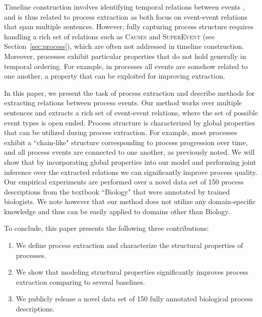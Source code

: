 Timeline construction involves identifying temporal relations between events \cite{Chambers08,Yoshikawa09,Denis11,Do12,Mcclosky12}, and is thus related to process extraction as both focus on event-event relations that span multiple sentences. However, fully capturing process structure requires handling a rich set of relations such as \textsc{Causes} and \textsc{SuperEvent} (see Section~\ref{sec:process}), which are often not addressed in timeline construction. Moreover, processes exhibit particular properties that do not hold generally in temporal ordering. For example, in processes all events are somehow related to one another, a property that can be exploited for improving extraction.

In this paper, we present the task of process extraction and describe methods for extracting relations between process events. Our method works over multiple sentences and extracts a rich set of event-event relations, where the set of possible event types is open ended. Process structure is characterized by global properties that can be utilized during process extraction. For example, most processes exhibit a ``chain-like" structure corresponding to process progression over time, and all process events are connected to one another, as previously noted. We will show that by incorporating global properties into our model and performing joint inference over the extracted relations we can significantly improve process quality.  Our empirical experiments are performed over a novel data set of 150 process descriptions from the textbook ``Biology" \cite{CampbellReece} that were annotated by trained biologists. We note however that our method does not utilize any domain-specific knowledge and thus can be easily applied to domains other than Biology.

To conclude, this paper presents the following three contributions:
\begin{enumerate}[itemsep=0pt,topsep=0pt] 
\item We define process extraction and characterize the structural properties of processes.
\item We show that modeling structural properties significantly improves process extraction comparing to several baselines.
\item  We publicly release a novel data set of 150 fully annotated biological process descriptions.
\end{enumerate}
